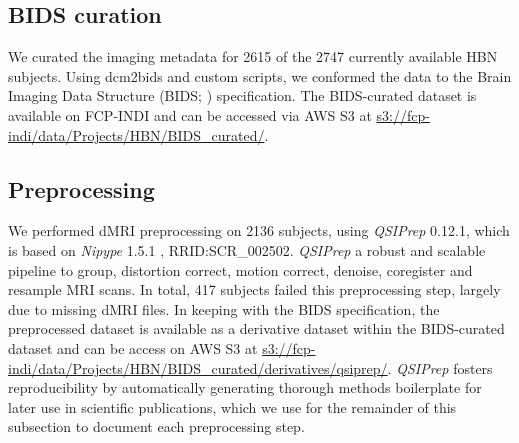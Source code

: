 \documentclass[fleqn,10pt]{wlscirep}
\begin{document}
\subsection*{BIDS curation}

We curated the imaging metadata for \num{2615} of the \num{2747} currently
available HBN subjects. Using dcm2bids and custom scripts, we conformed the data
to the Brain Imaging Data Structure (BIDS; \cite{gorgolewski2016-lh})
specification. The BIDS-curated dataset is available on FCP-INDI and can be
accessed via AWS S3 at \url{s3://fcp-indi/data/Projects/HBN/BIDS_curated/}.


\subsection*{Preprocessing}

We performed dMRI preprocessing on \num{2136} subjects, using \emph{QSIPrep}
\cite{cieslak2021-iq} 0.12.1, which is based on \emph{Nipype} 1.5.1
\cite{nipype1,nipype2}, RRID:SCR\_002502. \emph{QSIPrep} a robust and scalable
pipeline to group, distortion correct, motion correct, denoise, coregister and
resample MRI scans. In total, \num{417} subjects failed this preprocessing
step, largely due to missing dMRI files. In keeping with the BIDS specification,
the preprocessed dataset is available as a derivative dataset within the
BIDS-curated dataset and can be access on AWS S3 at
\url{s3://fcp-indi/data/Projects/HBN/BIDS_curated/derivatives/qsiprep/}.
\emph{QSIPrep} fosters reproducibility by automatically generating thorough
methods boilerplate for later use in scientific publications, which we use for
the remainder of this subsection to document each preprocessing step.
\end{document}
